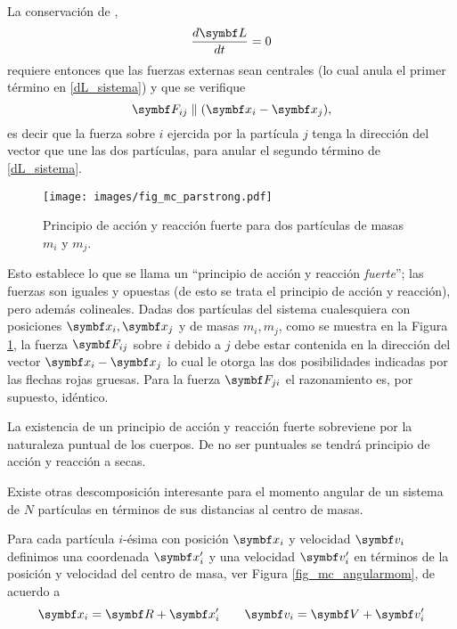 \documentclass[10pt,oneside]{CBFT_book}
\begin{document}
La conservación de ,
\[
	\dtot{\vb{L}}{t} = 0	
\]
requiere entonces que las fuerzas externas sean centrales (lo cual anula el primer término en \eqref{dL_sistema}) y que 
se verifique 
\[
	\vb{F}_{ij}  \parallel ( \vb{x}_i - \vb{x}_j ),
\]
es decir que la fuerza sobre $i$ ejercida por la partícula $j$ tenga la dirección del vector que une las dos 
partículas, para anular el segundo término de \eqref{dL_sistema}.

\begin{figure}[htb]
	\begin{center}
	\texttt{[image: images/fig\_mc\_parstrong.pdf]}	
	\end{center}
	\caption{Principio de acción y reacción fuerte para dos partículas de masas $m_i$ y $m_j$.}
	\label{fig_mc_parstrong}
\end{figure} 

Esto establece lo que se llama un ``principio de acción y reacción {\it fuerte}''; las fuerzas son iguales y opuestas 
(de esto se trata el principio de acción y reacción), pero además colineales.
Dadas dos partículas del sistema cualesquiera con posiciones $ \vb{x}_i, \vb{x}_j $ y de masas $ m_i, m_j $, como se 
muestra en la Figura \ref{fig_mc_parstrong}, la fuerza $\vb{F}_{ij}$ sobre $i$ debido a $j$ debe estar contenida en la 
dirección del vector $ \vb{x}_i - \vb{x}_j $ lo cual le otorga las dos posibilidades indicadas por las flechas rojas 
gruesas. Para la fuerza $\vb{F}_{ji}$ el razonamiento es, por supuesto, idéntico.


La existencia de un principio de acción y reacción fuerte sobreviene por la naturaleza puntual de los cuerpos. De no 
ser puntuales se tendrá principio de acción y reacción a secas.

Existe otras descomposición interesante para el momento angular  de un sistema de $N$ partículas en términos de 
sus distancias al centro de masas.

Para cada partícula $i$-ésima con posición $ \vb{x}_i $ y velocidad $ \vb{v}_i $ definimos una coordenada $ \vb{x}_i' $ 
y una velocidad $\vb{v}_i' $ en términos de la posición  y velocidad  del centro de masa, ver Figura 
\ref{fig_mc_angularmom}, de acuerdo a
\[
	\vb{x}_i = \vb{R} + \vb{x}_i' \qquad \vb{v}_i = \vb{V} + \vb{v}_i'
\]
\end{document}
